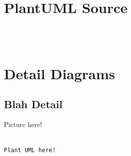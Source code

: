 \documentclass[10pt,a4paper]{article}
\begin{document}
\section{PlantUML Source}
\begin{verbatim}



\end{verbatim}


\section{Detail Diagrams}

\subsection{Blah Detail}

Picture here!
\begin{verbatim}

Plant UML here!

\end{verbatim}
\end{document}
